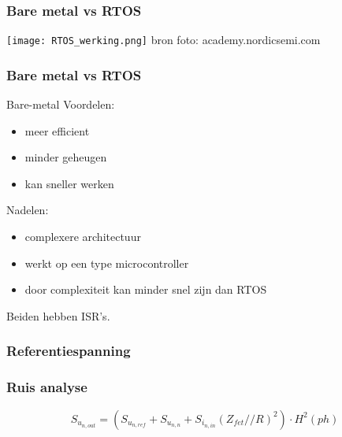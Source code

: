 \begin{frame}
    \frametitle{Bare metal vs RTOS}
    \texttt{[image: RTOS\_werking.png]}
    bron foto: academy.nordicsemi.com
\end{frame}

\begin{frame}
    \frametitle{Bare metal vs RTOS}
    Bare-metal
    Voordelen:
    \begin{itemize}
        \item meer efficient
        \item minder geheugen
        \item kan sneller werken
    \end{itemize}
    \vspace{0.5cm}
    Nadelen:
    \begin{itemize}
        \item complexere architectuur
        \item werkt op een type microcontroller
        \item door complexiteit kan minder snel zijn dan RTOS
    \end{itemize}
    \vspace{0.5cm}
    Beiden hebben ISR's.
\end{frame}


\begin{frame}
    \frametitle{Referentiespanning}
    


\end{frame}


\begin{frame}
    \frametitle{Ruis analyse}

    \begin{figure}
        \centering
        \def\svgwidth{0.7\textwidth}
        
    \end{figure}
    \begin{equation*}\label{eq:measureNoiseOut}
        S_{u_{{n,out}}} = \left(S_{u_{{n,ref}}} + S_{u_{{n,n}}} + S_{i_{{n,in}}}\left(Z_{fet} // R\right)^2\right) \cdot H^2(ph)
    \end{equation*}

\end{frame}

